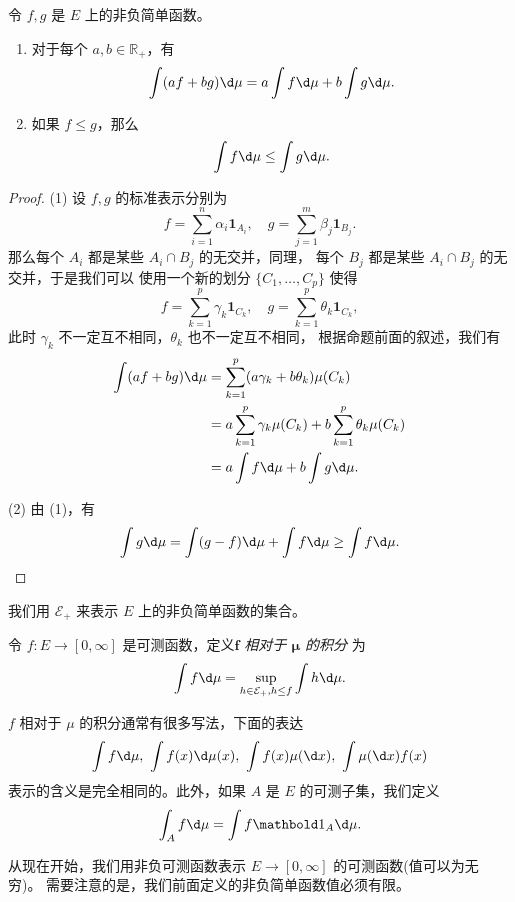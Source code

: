 \documentclass[fontset=none]{Notes}
\begin{document}
\begin{proposition}
  令 $f,g$ 是 $E$ 上的非负简单函数。
  \begin{enumerate}
    \item 对于每个 $a,b\in \mathbb{R}_+$，有
    \[
      \int(af+bg)\d\mu=a\int f\d\mu+b\int g\d\mu.
    \]
    \item 如果 $f\leq g$，那么
    \[
      \int f\d\mu\leq \int g\d\mu.
    \]
  \end{enumerate}
\end{proposition}
\begin{proof}
  (1) 设 $f,g$ 的标准表示分别为
  \[
    f=\sum_{i=1}^n\alpha_i\mathbold 1_{A_i},\quad  
    g=\sum_{j=1}^m\beta_j\mathbold 1_{B_j}.  
  \]
  那么每个 $A_i$ 都是某些 $A_i\cap B_j$ 的无交并，同理，
  每个 $B_j$ 都是某些 $A_i\cap B_j$ 的无交并，于是我们可以
  使用一个新的划分 $\{C_1,\dots,C_p\}$ 使得
  \[
    f=\sum_{k=1}^p \gamma_k\mathbold 1_{C_k} ,\quad
    g=\sum_{k=1}^p \theta_k\mathbold 1_{C_k} ,
  \]
  此时 $\gamma_k$ 不一定互不相同，$\theta_k$ 也不一定互不相同，
  根据命题前面的叙述，我们有
  \begin{align*}
    \int
    (af+bg)\d\mu&=\sum_{k=1}^p(a\gamma_k+b\theta_k)  \mu(C_k)\\&=
    a\sum_{k=1}^p\gamma_k\mu(C_k)+b\sum_{k=1}^p\theta_k\mu(C_k)\\
    &=a\int f\d\mu+b\int g\d\mu.
  \end{align*}

  (2) 由 (1)，有
  \[
    \int g\d\mu=\int(g-f)\d\mu+\int f\d\mu\geq \int f\d\mu.\qedhere  
  \]
\end{proof}

我们用 $\mathcal{E}_+$ 来表示 $E$ 上的非负简单函数的集合。

\begin{definition}
  令 $f:E\to[0,\infty]$ 是可测函数，定义\emph{$\mathbold f$ 相对于 $\mathbold\mu$ 的积分}
  为
  \[
    \int f\d\mu=\sup_{h\in \mathcal{E}_+,h\leq f}\int h\d\mu.
  \]
\end{definition}

$f$ 相对于 $\mu$ 的积分通常有很多写法，下面的表达
\[
  \int f\d\mu,\ \int f(x)\d\mu(x),\ \int f(x)\mu(\d x),\ \int\mu(\d x)f(x)
\]
表示的含义是完全相同的。此外，如果 $A$ 是 $E$ 的可测子集，我们定义
\[
  \int_A f\d\mu=\int f\mathbold 1_A\d\mu.
\]

从现在开始，我们用非负可测函数表示 $E\to [0,\infty]$ 的可测函数(值可以为无穷)。
需要注意的是，我们前面定义的非负简单函数值必须有限。
\end{document}
